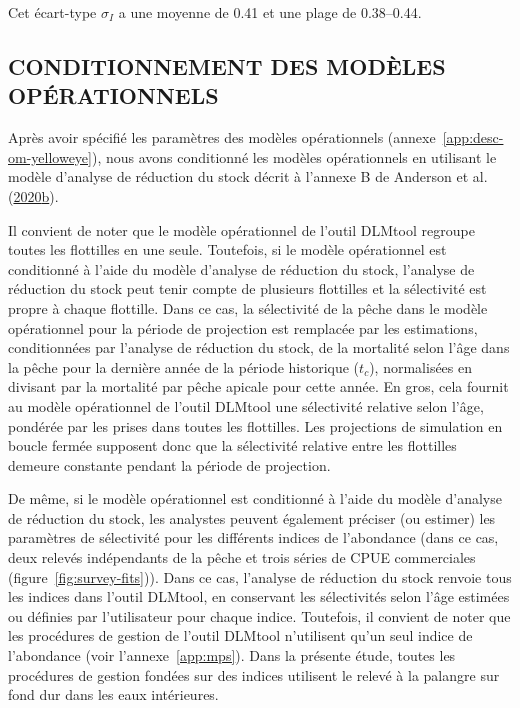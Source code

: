 \documentclass[french,11pt]{book}
\begin{document}
Cet écart-type \(\sigma_I\) a une moyenne de 0.41 et une plage de 0.38--0.44.

\hypertarget{sec:approach3-conditioning}{%
\subsection{CONDITIONNEMENT DES MODÈLES OPÉRATIONNELS}\label{sec:approach3-conditioning}}

Après avoir spécifié les paramètres des modèles opérationnels (annexe~\ref{app:desc-om-yelloweye}), nous avons conditionné les modèles opérationnels en utilisant le modèle d'analyse de réduction du stock décrit à l'annexe B de Anderson et al. (\protect\hyperlink{ref-anderson2020gfmp}{2020}\protect\hyperlink{ref-anderson2020gfmp}{b}).

Il convient de noter que le modèle opérationnel de l'outil DLMtool regroupe toutes les flottilles en une seule. Toutefois, si le modèle opérationnel est conditionné à l'aide du modèle d'analyse de réduction du stock, l'analyse de réduction du stock peut tenir compte de plusieurs flottilles et la sélectivité est propre à chaque flottille. Dans ce cas, la sélectivité de la pêche dans le modèle opérationnel pour la période de projection est remplacée par les estimations, conditionnées par l'analyse de réduction du stock, de la mortalité selon l'âge dans la pêche pour la dernière année de la période historique (\(t_c\)), normalisées en divisant par la mortalité par pêche apicale pour cette année. En gros, cela fournit au modèle opérationnel de l'outil DLMtool une sélectivité relative selon l'âge, pondérée par les prises dans toutes les flottilles. Les projections de simulation en boucle fermée supposent donc que la sélectivité relative entre les flottilles demeure constante pendant la période de projection.

De même, si le modèle opérationnel est conditionné à l'aide du modèle d'analyse de réduction du stock, les analystes peuvent également préciser (ou estimer) les paramètres de sélectivité pour les différents indices de l'abondance (dans ce cas, deux relevés indépendants de la pêche et trois séries de CPUE commerciales (figure~\ref{fig:survey-fits})). Dans ce cas, l'analyse de réduction du stock renvoie tous les indices dans l'outil DLMtool, en conservant les sélectivités selon l'âge estimées ou définies par l'utilisateur pour chaque indice. Toutefois, il convient de noter que les procédures de gestion de l'outil DLMtool n'utilisent qu'un seul indice de l'abondance (voir l'annexe~\ref{app:mps}). Dans la présente étude, toutes les procédures de gestion fondées sur des indices utilisent le relevé à la palangre sur fond dur dans les eaux intérieures.
\end{document}
